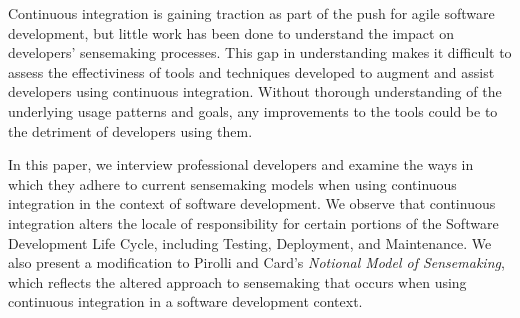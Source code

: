 \documentclass{sig-alternate}
\begin{document}
%
\author{
%
%
\alignauthor
Nicholas Nelson\\
       \\
       \\
\alignauthor
Charles Hill\\
       \\
       \\
}

\newcommand{\michael}{P1}
\newcommand{\sruti}{P2}
\newcommand{\caius}{P3 }
\newcommand{\srutitwo}{P4}
\newcommand{\david}{P5}
\newcommand{\cpg}{P6}

\maketitle
\begin{abstract}
\end{abstract}
Continuous integration is gaining traction as part of the push for agile software development, but little work has been done to understand the impact on developers' sensemaking processes.
This gap in understanding makes it difficult to assess the effectiviness of tools and techniques developed to augment and assist developers using continuous integration. Without thorough understanding of the underlying usage patterns and goals, any improvements to the tools could be to the detriment of developers using them.

 In this paper, we interview professional developers and examine the ways in which they adhere to current sensemaking models when using continuous integration in the context of software development. We observe that continuous integration alters the locale of responsibility for certain portions of the Software Development Life Cycle, including Testing, Deployment, and Maintenance. We also present a modification to Pirolli and Card's \textit{Notional Model of Sensemaking}, which reflects the altered approach to sensemaking that occurs when using continuous integration in a software development context.
\smallskip
\end{document}
